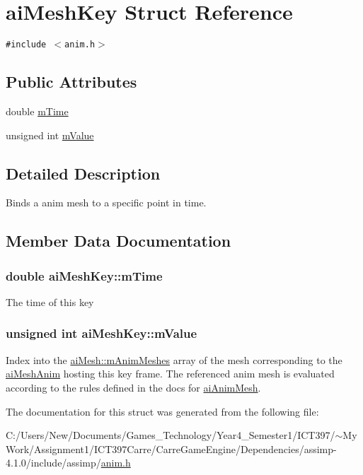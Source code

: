\hypertarget{structai_mesh_key}{
\section{aiMeshKey Struct Reference}
\label{structai_mesh_key}
}
{\tt \#include $<$anim.h$>$}

\subsection*{Public Attributes}
\begin{CompactItemize}
\item 
double \hyperlink{structai_mesh_key_0814e4b14ed162295ba19331410a51ab}{mTime}
\item 
unsigned int \hyperlink{structai_mesh_key_bdd5914697609a9d876f63b6ca090a18}{mValue}
\end{CompactItemize}


\subsection{Detailed Description}
Binds a anim mesh to a specific point in time. 

\subsection{Member Data Documentation}
\hypertarget{structai_mesh_key_0814e4b14ed162295ba19331410a51ab}{
\subsubsection[mTime]{\setlength{\rightskip}{0pt plus 5cm}double {\bf aiMeshKey::mTime}}}
\label{structai_mesh_key_0814e4b14ed162295ba19331410a51ab}


The time of this key \hypertarget{structai_mesh_key_bdd5914697609a9d876f63b6ca090a18}{
\subsubsection[mValue]{\setlength{\rightskip}{0pt plus 5cm}unsigned int {\bf aiMeshKey::mValue}}}
\label{structai_mesh_key_bdd5914697609a9d876f63b6ca090a18}


Index into the \hyperlink{structai_mesh_5078f7db7e99ed05db89dfa412f0e990}{aiMesh::mAnimMeshes} array of the mesh corresponding to the \hyperlink{structai_mesh_anim}{aiMeshAnim} hosting this key frame. The referenced anim mesh is evaluated according to the rules defined in the docs for \hyperlink{structai_anim_mesh}{aiAnimMesh}. 

The documentation for this struct was generated from the following file:\begin{CompactItemize}
\item 
C:/Users/New/Documents/Games\_\-Technology/Year4\_\-Semester1/ICT397/$\sim$My Work/Assignment1/ICT397Carre/CarreGameEngine/Dependencies/assimp-4.1.0/include/assimp/\hyperlink{anim_8h}{anim.h}\end{CompactItemize}
